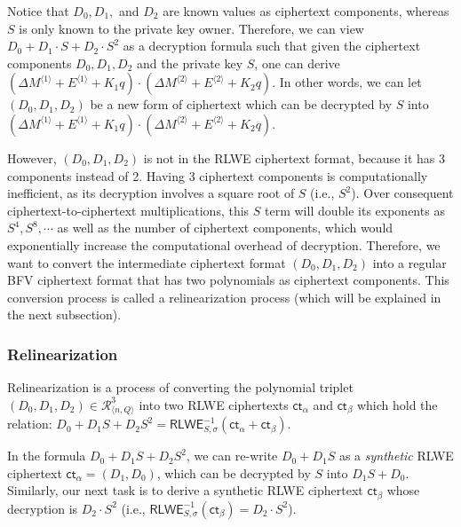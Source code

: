 Notice that $D_0, D_1,$ and $D_2$ are known values as ciphertext components, whereas $S$ is only known to the private key owner. Therefore, we can view $D_0 + D_1\cdot S + D_2\cdot S^2$ as a decryption formula such that given the ciphertext components $D_0, D_1, D_2$ and the private key $S$, one can derive $(\Delta M^{\langle 1 \rangle} + E^{\langle 1 \rangle} + K_1q) \cdot (\Delta M^{\langle 2 \rangle} + E^{\langle 2 \rangle} + K_2q)$. In other words, we can let $(D_0, D_1, D_2)$ be a new form of ciphertext which can be decrypted by $S$ into $(\Delta M^{\langle 1 \rangle} + E^{\langle 1 \rangle} + K_1q) \cdot (\Delta M^{\langle 2 \rangle} + E^{\langle 2 \rangle} + K_2q)$. 

However, $(D_0, D_1, D_2)$ is not in the RLWE ciphertext format, because it has 3 components instead of 2. Having 3 ciphertext components is computationally inefficient, as its decryption involves a square root of $S$ (i.e., $ S^2$). Over consequent ciphertext-to-ciphertext multiplications, this $S$ term will double its exponents as $S^4, S^8, \cdots$ as well as the number of ciphertext components, which would exponentially increase the computational overhead of decryption. Therefore, we want to convert the intermediate ciphertext format $(D_0, D_1, D_2)$ into a regular BFV ciphertext format that has two polynomials as ciphertext components. This conversion process is called a relinearization process (which will be explained in the next subsection). 



\subsubsection{Relinearization}
\label{subsubsec:bfv-mult-cipher-relinearization}

Relinearization is a process of converting the polynomial triplet $(D_0, D_1, D_2) \in \mathcal{R}_{\langle n, Q \rangle}^{3}$ into two RLWE ciphertexts $\textsf{ct}_\alpha$ and $\textsf{ct}_\beta$ which hold the relation: $D_0 + D_1 S + D_2 S^2 = \textsf{RLWE}^{-1}_{S, \sigma}(\textsf{ct}_\alpha + \textsf{ct}_\beta)$. 

In the formula $D_0 + D_1 S + D_2 S^2$, we can re-write $D_0 + D_1 S$ as a \textit{synthetic} RLWE ciphertext $\textsf{ct}_\alpha = (D_1, D_0)$, which can be decrypted by $S$ into $D_1 S + D_0$. Similarly, our next task is to derive a synthetic RLWE ciphertext $\textsf{ct}_\beta$ whose decryption is $D_2 \cdot S^2$ (i.e., $\textsf{RLWE}_{S, \sigma}^{-1}(\textsf{ct}_\beta) = D_2\cdot S^2$). 

